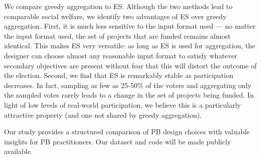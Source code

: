 \documentclass[letterpaper]{article} %
\newcommand{\mes}{ES}
\begin{document}
We compare greedy aggregation to \mes{}. Although the two methods lead to comparable social welfare, we identify two  advantages of \mes{} over greedy aggregation. First, it is much less sensitive to the input format used --- no matter the input format used, the set of projects that are funded remains almost identical. This makes \mes{} very versatile: as long as \mes{} is used for aggregation, the designer can choose almost any reasonable input format to satisfy whatever secondary objectives are present without fear that this will distort the outcome of the election. Second, we find that \mes{} is remarkably stable as participation decreases. In fact, sampling as few as 25-50\% of the voters and aggregating only the sampled votes rarely leads to a change in the set of projects being funded. In light of low levels of real-world participation, we believe this is a particularly attractive property (and one  not shared by greedy aggregation). 

Our study provides  a structured comparison of PB design choices with valuable insights for PB practitioners.  Our dataset and code will be made publicly available. %


\end{document}
